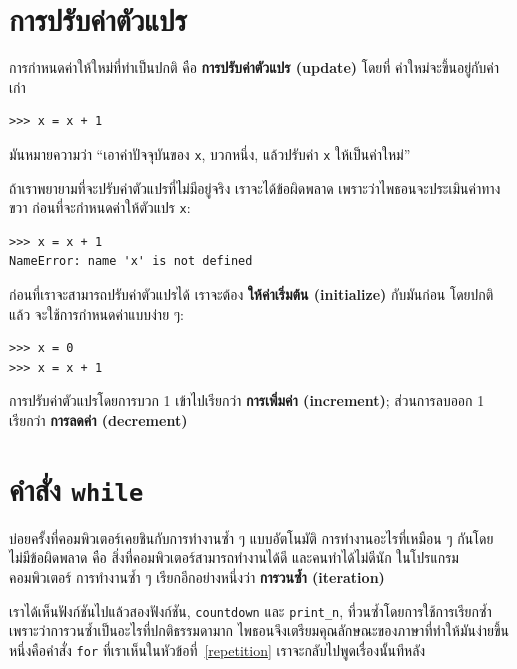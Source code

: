 \section{การปรับค่าตัวแปร} %
\label{update}


การกำหนดค่าให้ใหม่ที่ทำเป็นปกติ คือ {\bf การปรับค่าตัวแปร (update)} โดยที่
ค่าใหม่จะขึ้นอยู่กับค่าเก่า


\begin{verbatim}
>>> x = x + 1
\end{verbatim}
%
มันหมายความว่า ``เอาค่าปัจจุบันของ {\tt x}, บวกหนึ่ง, แล้วปรับค่า {\tt x} ให้เป็นค่าใหม่''

ถ้าเราพยายามที่จะปรับค่าตัวแปรที่ไม่มีอยู่จริง เราจะได้ข้อผิดพลาด เพราะว่าไพธอนจะประเมินค่าทางขวา 
ก่อนที่จะกำหนดค่าให้ตัวแปร {\tt x}:

\begin{verbatim}
>>> x = x + 1
NameError: name 'x' is not defined
\end{verbatim}
%
ก่อนที่เราจะสามารถปรับค่าตัวแปรได้ เราจะต้อง {\bf ให้ค่าเริ่มต้น (initialize)} กับมันก่อน
โดยปกติแล้ว จะใช้การกำหนดค่าแบบง่าย ๆ:

\begin{verbatim}
>>> x = 0
>>> x = x + 1
\end{verbatim}
%
การปรับค่าตัวแปรโดยการบวก 1 เข้าไปเรียกว่า {\bf การเพิ่มค่า (increment)};
ส่วนการลบออก 1 เรียกว่า {\bf การลดค่า (decrement)}



\section{คำสั่ง {\tt while}}

บ่อยครั้งที่คอมพิวเตอร์เคยชินกับการทำงานซ้ำ ๆ แบบอัตโนมัติ การทำงานอะไรที่เหมือน ๆ 
กันโดยไม่มีข้อผิดพลาด คือ สิ่งที่คอมพิวเตอร์สามารถทำงานได้ดี และคนทำได้ไม่ดีนัก
ในโปรแกรมคอมพิวเตอร์ การทำงานซ้ำ ๆ เรียกอีกอย่างหนึ่งว่า {\bf การวนซ้ำ (iteration)}

เราได้เห็นฟังก์ชันไปแล้วสองฟังก์ชัน, {\tt countdown} และ \verb"print_n", ที่วนซ้ำโดยการใช้การเรียกซ้ำ
เพราะว่าการวนซ้ำเป็นอะไรที่ปกติธรรมดามาก ไพธอนจึงเตรียมคุณลักษณะของภาษาที่ทำให้มันง่ายขึ้น
หนึ่งคือคำสั่ง {\tt for} ที่เราเห็นในหัวข้อที่~\ref{repetition} เราจะกลับไปพูดเรื่องนั้นทีหลัง 

